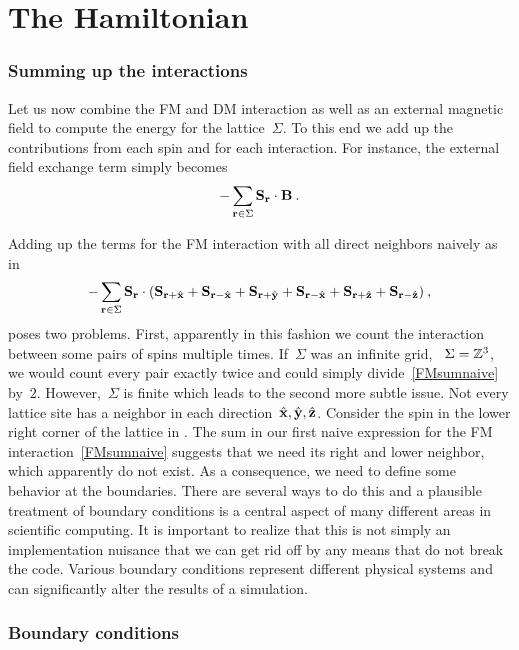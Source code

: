\section{The Hamiltonian}\label{sec:hamiltonian}
%
\subsubsection{Summing up the interactions}

Let us now combine the FM and DM interaction as well as an external magnetic
field to compute the energy for the lattice~$\Sigma$. To this end we add up the
contributions from each spin and for each interaction. For instance, the
external field exchange term simply becomes
%
\begin{equation}\label{Bsum}
  -\sum_{\mathbf{r} \in \Sigma} \mathbf{S}_{\mathbf{r}} \cdot \mathbf{B}\:.
\end{equation}
%

Adding up the terms for the FM interaction with all direct neighbors naively as
in
%
\begin{equation}\label{FMsumnaive}
  -\sum_{\mathbf{r} \in \Sigma} \mathbf{S}_{\mathbf{r}} \cdot (\mathbf{S}_{\mathbf{r} + \hat{\mathbf{x}}} + \mathbf{S}_{\mathbf{r} - \hat{\mathbf{x}}} +
    \mathbf{S}_{\mathbf{r} + \hat{\mathbf{y}}} + \mathbf{S}_{\mathbf{r} - \hat{\mathbf{x}}} + \mathbf{S}_{\mathbf{r} + \hat{\mathbf{z}}} + \mathbf{S}_{\mathbf{r} - \hat{\mathbf{z}}})\:,
\end{equation}
%
poses two problems. First, apparently in this fashion we count the interaction
between some pairs of spins multiple times. If~$\Sigma$ was an infinite grid,
\ie{}~$\Sigma=\mathbb{Z}^3$, we would count every pair exactly twice and could simply
divide~\eqref{FMsumnaive} by~$2$. However,~$\Sigma$ is finite which leads
to the second more subtle issue. Not every lattice site has a neighbor in each
direction~$\hat{\mathbf{x}}, \hat{\mathbf{y}}, \hat{\mathbf{z}}$. Consider the spin in the lower right corner of the
lattice in . The sum in our first naive expression for the
FM interaction~\eqref{FMsumnaive} suggests that we need its right and lower
neighbor, which apparently do not exist. As a consequence, we need to define
some behavior at the boundaries. There are several ways to do this and a
plausible treatment of boundary conditions is a central aspect of many different
areas in scientific computing. It is important to realize that this is not
simply an implementation nuisance that we can get rid off by any means that do
not break the code. Various boundary conditions represent different physical
systems and can significantly alter the results of a simulation.

\subsubsection{Boundary conditions}

